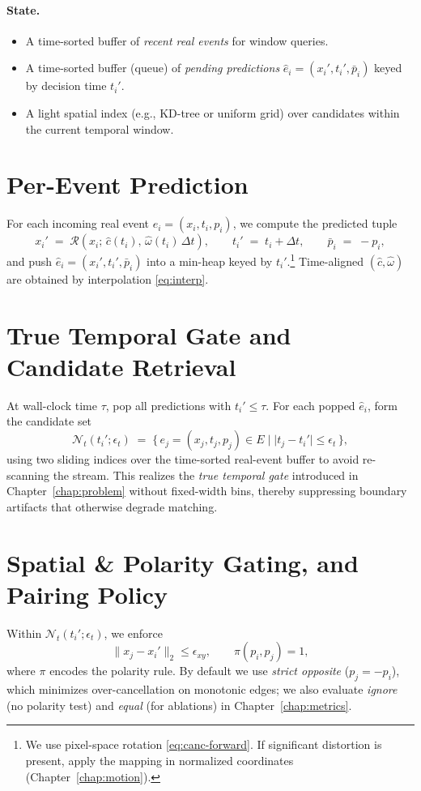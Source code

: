 \paragraph{State.}
\begin{itemize}
    \item A time-sorted buffer of \emph{recent real events} for window queries.
    \item A time-sorted buffer (queue) of \emph{pending predictions} $\hat e_i=(x_i',t_i',\bar p_i)$ keyed by decision time $t_i'$.
    \item A light spatial index (e.g., KD-tree or uniform grid) over candidates within the current temporal window.
\end{itemize}

\section{Per-Event Prediction}
For each incoming real event $e_i=(x_i,t_i,p_i)$, we compute the predicted tuple
\begin{equation}
x_i' \;=\; \mathcal{R}\!\left(x_i;\,\hat c(t_i),\,\hat\omega(t_i)\,\Delta t\right),
\qquad
t_i' \;=\; t_i+\Delta t,
\qquad
\bar p_i \;=\; -p_i,
\label{eq:canc-forward}
\end{equation}
and push $\hat e_i=(x_i',t_i',\bar p_i)$ into a min-heap keyed by $t_i'$.\footnote{We use pixel-space rotation \eqref{eq:canc-forward}. If significant distortion is present, apply the mapping in normalized coordinates (Chapter~\ref{chap:motion}).} Time-aligned $(\hat c,\hat\omega)$ are obtained by interpolation \eqref{eq:interp}.

\section{True Temporal Gate and Candidate Retrieval}
At wall-clock time $\tau$, pop all predictions with $t_i' \le \tau$. For each popped $\hat e_i$, form the candidate set
\begin{equation}
\mathcal{N}_t(t_i';\epsilon_t) \;=\; \{\,e_j=(x_j,t_j,p_j)\in E \;|\; |t_j - t_i'| \le \epsilon_t \,\},
\label{eq:true-window}
\end{equation}
using two sliding indices over the time-sorted real-event buffer to avoid re-scanning the stream. This realizes the \emph{true temporal gate} introduced in Chapter~\ref{chap:problem} without fixed-width bins, thereby suppressing boundary artifacts that otherwise degrade matching.

\section{Spatial \& Polarity Gating, and Pairing Policy}
Within $\mathcal{N}_t(t_i';\epsilon_t)$, we enforce
\begin{equation}
\|x_j - x_i'\|_2 \le \epsilon_{xy}, 
\qquad \pi(p_i,p_j)=1,
\label{eq:spat-pol-gate}
\end{equation}
where $\pi$ encodes the polarity rule. By default we use \emph{strict opposite} ($p_j=-p_i$), which minimizes over-cancellation on monotonic edges; we also evaluate \emph{ignore} (no polarity test) and \emph{equal} (for ablations) in Chapter~\ref{chap:metrics}.


